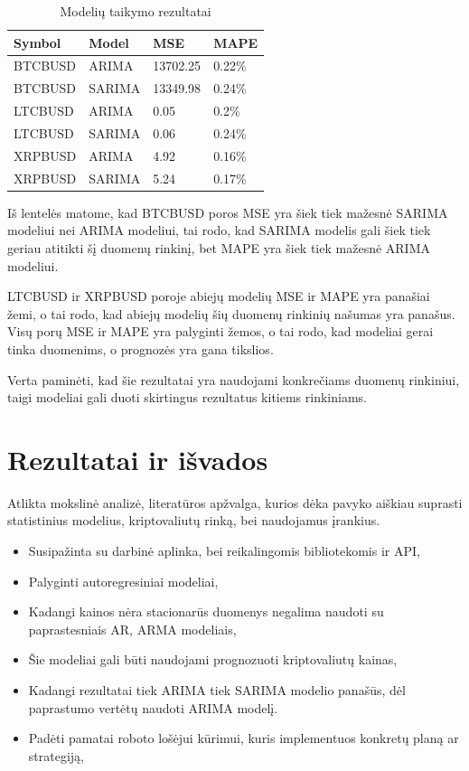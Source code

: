 \documentclass{VUMIFInfKursinis}
\begin{document}
\begin{table}[H]
  \centering
  \begin{tabularx}{\linewidth}{|X|X|X|X|}
    \hline
    Symbol  & Model  & MSE      & MAPE   \\
    \hline
    \hline
    BTCBUSD & ARIMA  & 13702.25 & 0.22\% \\
    \hline
    BTCBUSD & SARIMA & 13349.98 & 0.24\% \\
    \hline
    \hline
    LTCBUSD & ARIMA  & 0.05     & 0.2\%  \\
    \hline
    LTCBUSD & SARIMA & 0.06     & 0.24\% \\
    \hline
    \hline
    XRPBUSD & ARIMA  & 4.92     & 0.16\% \\
    \hline
    XRPBUSD & SARIMA & 5.24     & 0.17\% \\
    \hline
  \end{tabularx}
  \caption{Modelių taikymo rezultatai}
  \label{table:rezultatai}
\end{table}

Iš lentelės matome, kad BTCBUSD poros MSE yra šiek tiek mažesnė SARIMA modeliui nei ARIMA modeliui, tai rodo, kad SARIMA modelis gali šiek tiek geriau atitikti šį duomenų rinkinį, bet MAPE yra šiek tiek mažesnė ARIMA modeliui.

LTCBUSD ir XRPBUSD poroje abiejų modelių MSE ir MAPE yra panašiai žemi, o tai rodo, kad abiejų modelių šių duomenų rinkinių našumas yra panašus. Visų porų MSE ir MAPE yra palyginti žemos, o tai rodo, kad modeliai gerai tinka duomenims, o prognozės yra gana tikslios.

Verta paminėti, kad šie rezultatai yra naudojami konkrečiams duomenų rinkiniui, taigi modeliai gali duoti skirtingus rezultatus kitiems rinkiniams.


\section{Rezultatai ir išvados}
Atlikta mokslinė analizė, literatūros apžvalga, kurios dėka pavyko aiškiau suprasti statistinius modelius, kriptovaliutų rinką, bei naudojamus įrankius.
\begin{itemize}
  \item Susipažinta su darbinė aplinka, bei reikalingomis bibliotekomis ir API,
  \item Palyginti autoregresiniai modeliai,
  \item Kadangi kainos nėra stacionarūs duomenys negalima naudoti su paprastesniais AR, ARMA modeliais,
  \item Šie modeliai gali būti naudojami prognozuoti kriptovaliutų kainas,
  \item Kadangi rezultatai tiek ARIMA tiek SARIMA modelio panašūs, dėl paprastumo vertėtų naudoti ARIMA modelį.
  \item Padėti pamatai roboto lošėjui kūrimui, kuris implementuos konkretų planą ar strategiją,
\end{itemize}
\end{document}

